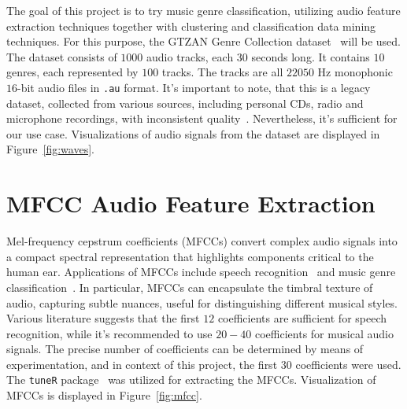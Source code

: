 \documentclass[twocolumn]{article}
\begin{document}
The goal of this project is to try music genre classification, utilizing audio feature extraction techniques together with clustering and classification data mining techniques. For this purpose, the GTZAN Genre Collection dataset~\cite{tzanetakis_essl_cook_2001} will be used. The dataset consists of $1000$ audio tracks, each $30$ seconds long. It contains $10$ genres, each represented by $100$ tracks. The tracks are all $22050$ Hz monophonic $16$-bit audio files in \texttt{.au} format. It's important to note, that this is a legacy dataset, collected from various sources, including personal CDs, radio and microphone recordings, with inconsistent quality~\cite{sturm2013gtzan}. Nevertheless, it's sufficient for our use case. Visualizations of audio signals from the dataset are displayed in Figure~\ref{fig:waves}.
\section{MFCC Audio Feature Extraction}
Mel-frequency cepstrum coefficients (MFCCs) convert complex audio signals into a compact spectral representation that highlights components critical to the human ear. Applications of MFCCs include speech recognition~\cite{ganchev2005comparative} and music genre classification~\cite{lerch2012introduction}. In particular, MFCCs can encapsulate the timbral texture of audio, capturing subtle nuances, useful for distinguishing different musical styles. Various literature suggests that the first $12$ coefficients are sufficient for speech recognition, while it's recommended to use $20-40$ coefficients for musical audio signals. The precise number of coefficients can be determined by means of experimentation, and in context of this project, the first $30$ coefficients were used. The \texttt{tuneR} package~\cite{tuneR} was utilized for extracting the MFCCs. Visualization of MFCCs is displayed in Figure~\ref{fig:mfcc}.
\end{document}
